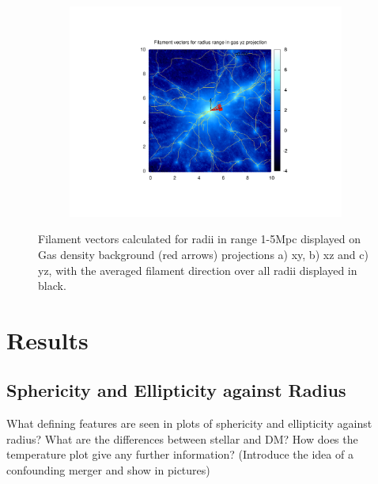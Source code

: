 \documentclass[journal]{IEEEtran}
\begin{document}
\begin{figure}[!t]
\begin{subfigure}[t]{0.3\textwidth}
		\includegraphics[width=\linewidth]{Filyz.pdf}
	\end{subfigure}
\label{fil_calc}
	\caption{Filament vectors calculated for radii in range 1-5Mpc displayed on Gas density background (red arrows) projections a) xy, b) xz and c) yz, with the averaged filament direction over all radii displayed in black.}
\end{figure}

\section{Results}
\subsection{Sphericity and Ellipticity against Radius}
What defining features are seen in plots of sphericity and ellipticity against radius? What are the differences between stellar and DM? How does the temperature plot give any further information?
(Introduce the idea of a confounding merger and show in pictures)
\end{document}
